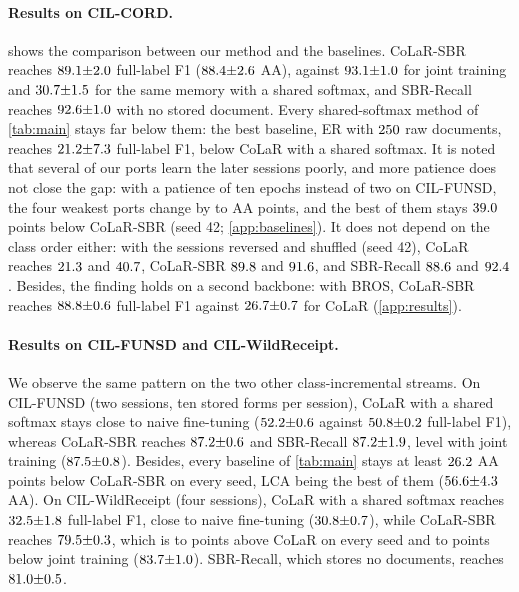\documentclass[10pt,twocolumn,letterpaper]{article}
\begin{document}
\paragraph{Results on CIL-CORD.}  shows the comparison between our method and the baselines. CoLaR-SBR reaches $89.1{\pm}2.0$ full-label F1 ($88.4{\pm}2.6$ AA), against $93.1{\pm}1.0$ for joint training and $30.7{\pm}1.5$ for the same memory with a shared softmax, and SBR-Recall reaches $92.6{\pm}1.0$ with no stored document. Every shared-softmax method of \cref{tab:main} stays far below them: the best baseline, ER with $250$ raw documents, reaches $21.2{\pm}7.3$ full-label F1, below CoLaR with a shared softmax. It is noted that several of our ports learn the later sessions poorly, and more patience does not close the gap: with a patience of ten epochs instead of two on CIL-FUNSD, the four weakest ports change by \nProbeDeltaMin{} to \nProbeDeltaMax{} AA points, and the best of them stays $39.0$ points below CoLaR-SBR (seed 42; \cref{app:baselines}). It does not depend on the class order either: with the sessions reversed and shuffled (seed 42), CoLaR reaches $21.3$ and $40.7$, CoLaR-SBR $89.8$ and $91.6$, and SBR-Recall $88.6$ and $92.4$. Besides, the finding holds on a second backbone: with BROS, CoLaR-SBR reaches $88.8{\pm}0.6$ full-label F1 against $26.7{\pm}0.7$ for CoLaR (\cref{app:results}).

\paragraph{Results on CIL-FUNSD and CIL-WildReceipt.} We observe the same pattern on the two other class-incremental streams. On CIL-FUNSD (two sessions, ten stored forms per session), CoLaR with a shared softmax stays close to naive fine-tuning ($52.2{\pm}0.6$ against $50.8{\pm}0.2$ full-label F1), whereas CoLaR-SBR reaches $87.2{\pm}0.6$ and SBR-Recall $87.2{\pm}1.9$, level with joint training ($87.5{\pm}0.8$). Besides, every baseline of \cref{tab:main} stays at least $26.2$ AA points below CoLaR-SBR on every seed, LCA being the best of them ($56.6{\pm}4.3$ AA). On CIL-WildReceipt (four sessions), CoLaR with a shared softmax reaches $32.5{\pm}1.8$ full-label F1, close to naive fine-tuning ($30.8{\pm}0.7$), while CoLaR-SBR reaches $79.5{\pm}0.3$, which is \nWildSbrMinusColarFullMin{} to \nWildSbrMinusColarFullMax{} points above CoLaR on every seed and \nWildJointMinusSbrFullMin{} to \nWildJointMinusSbrFullMax{} points below joint training ($83.7{\pm}1.0$). SBR-Recall, which stores no documents, reaches $81.0{\pm}0.5$.
\end{document}
